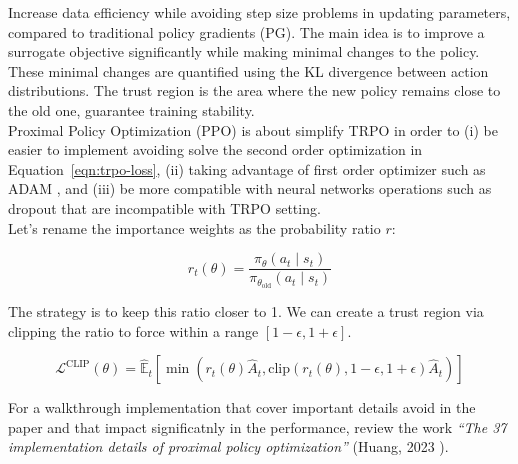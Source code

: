 
\noindent Increase data efficiency while avoiding step size problems in updating parameters, compared to traditional policy gradients (PG). The main idea is to improve a surrogate objective significantly while making minimal changes to the policy. These minimal changes are quantified using the KL divergence between action distributions. The trust region is the area where the new policy remains close to the old one, guarantee training stability. \\


\noindent Proximal Policy Optimization (PPO) \cite{schulman2017proximal} is about simplify TRPO in order to (i) be easier to implement avoiding solve the second order optimization in Equation~\ref{eqn:trpo-loss}, (ii) taking advantage of first order optimizer such as ADAM \cite{kingma2017adammethodstochasticoptimization}, and (iii) be more compatible with neural networks operations such as dropout that are incompatible with TRPO setting. \\

\noindent Let's rename the importance weights as the probability ratio $r$: 

\begin{equation}\label{eqn:importance-ratio-is}
    r_{t}(\theta) = \frac{\pi_{\theta}(a_{t}\mid s_{t})}{\pi_{\theta_{\text{old}}}(a_{t}\mid s_{t})}
\end{equation}

\noindent The strategy is to keep this ratio closer to 1. We can create a trust region via clipping the ratio to force within a range $\left[1-\epsilon, 1+\epsilon \right]$. 

\begin{equation}\label{eqn:clip-ac-objective}
\mathcal{L}^{\text{CLIP}}(\theta) = \hat{\mathbb{E}}_t \left[ \min \left( r_t(\theta) \hat{A}_t, \text{clip}(r_t(\theta), 1 - \epsilon, 1 + \epsilon) \hat{A}_t \right) \right]
\end{equation}

\noindent For a walkthrough implementation that cover important details avoid in the paper and that impact significatnly in the performance, review the work \textit{``The 37 implementation details of proximal policy optimization''} (Huang, 2023 \cite{dlr191986}).


